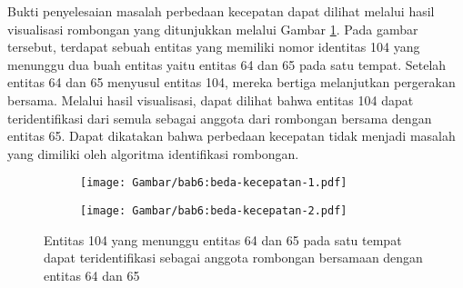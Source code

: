 Bukti penyelesaian masalah perbedaan kecepatan dapat dilihat melalui hasil visualisasi rombongan yang ditunjukkan melalui Gambar \ref{bab6:solusi-beda-kecepatan}. Pada gambar tersebut, terdapat sebuah entitas yang memiliki nomor identitas 104 yang menunggu dua buah entitas yaitu entitas 64 dan 65 pada satu tempat. Setelah entitas 64 dan 65 menyusul entitas 104, mereka bertiga melanjutkan pergerakan bersama. Melalui hasil visualisasi, dapat dilihat bahwa entitas 104 dapat teridentifikasi dari semula sebagai anggota dari rombongan bersama dengan entitas 65. Dapat dikatakan bahwa perbedaan kecepatan tidak menjadi masalah yang dimiliki oleh algoritma identifikasi rombongan.

\begin{figure}[h]
    \centering
    \captionsetup{width=.85\textwidth}
    \begin{subfigure}[h]{0.425\textwidth}
        \centering
        \texttt{[image: Gambar/bab6:beda-kecepatan-1.pdf]}
    \end{subfigure}
    \begin{subfigure}[h]{0.45\textwidth}
        \centering
        \texttt{[image: Gambar/bab6:beda-kecepatan-2.pdf]}
    \end{subfigure}
    \caption[Penyelesaian masalah beda kecepatan pada data CBE]{Entitas 104 yang menunggu entitas 64 dan 65 pada satu tempat dapat teridentifikasi sebagai anggota rombongan bersamaan dengan entitas 64 dan 65}
    \label{bab6:solusi-beda-kecepatan}
\end{figure}
